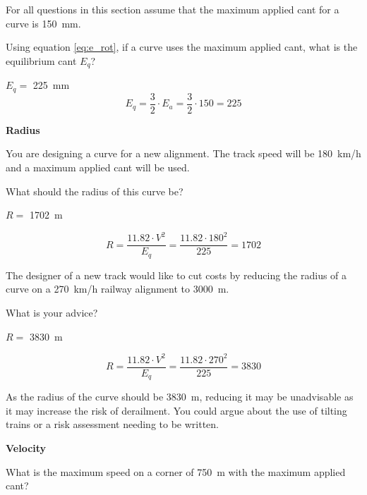 \documentclass{bcrre_exam}
\begin{document}
\begin{questions}

\question
For all questions in this section assume that the maximum applied cant for a curve is \qty{150}{mm}.

Using equation \ref{eq:e_rot}, if a curve uses the maximum applied cant, what is the equilibrium cant $E_q$?

\begin{solution}
    $E_q=$ \qty{225}{mm}
    \begin{equation}
        E_q = \frac{3}{2} \cdot E_a = \frac{3}{2} \cdot 150 = 225
    \end{equation}
\end{solution}
\vspace{1cm}
{\Large \bfseries Radius}

\question
You are designing a curve for a new alignment. The track speed will be \qty{180}{km/h} and a maximum applied cant will be used. 

What should the radius of this curve be?

\begin{solution}
    $R=$ \qty{1702}{m}
    
    \begin{equation}
        R=\frac{11.82 \cdot V^2}{E_q}=\frac{11.82 \cdot 180^2}{225}=1702
    \end{equation}
\end{solution}

\question
The designer of a new track would like to cut costs by reducing the radius of a curve on a \qty{270}{km/h} railway alignment to \qty{3000}{m}.

What is your advice?

\begin{solution}
    $R=$ \qty{3830}{m}
    
    \begin{equation}
        R=\frac{11.82 \cdot V^2}{E_q}=\frac{11.82 \cdot 270^2}{225}=3830
    \end{equation}

    As the radius of the curve should be \qty{3830}{m}, reducing it may be unadvisable as it may increase the risk of derailment. You could argue about the use of tilting trains or a risk assessment needing to be written.
\end{solution}
\vspace{1cm}
{\Large \bfseries Velocity}

\question
What is the maximum speed on a corner of \qty{750}{m} with the maximum applied cant?


\end{questions}
\end{document}
